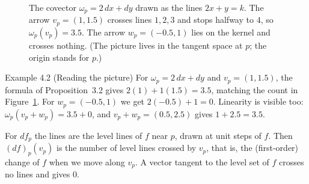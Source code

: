 \documentclass[11pt,letterpaper]{article}
\newcommand{\manualsubsection}[1]{%
  \Needspace{5\baselineskip}%
  \par\vspace{0.2cm}\noindent{\bfseries\color{orangeacc} #1}\par\nobreak
  \vspace{0.12cm}
}
\begin{document}
\begin{figure}[htbp]
\centering
{}
\caption{The covector $\omega_p=2\,dx+dy$ drawn as the lines $2x+y=k$. The arrow $v_p=(1,1.5)$ crosses lines $1,2,3$ and stops halfway to $4$, so $\omega_p(v_p)=3.5$. The arrow $w_p=(-0.5,1)$ lies on the kernel and crosses nothing. (The picture lives in the tangent space at $p$; the origin stands for $p$.)}
\label{fig:stack}
\end{figure}
\FloatBarrier

\begin{examplebox}{Example 4.2 (Reading the picture)}
For $\omega_p=2\,dx+dy$ and $v_p=(1,1.5)$, the formula of Proposition~3.2 gives $2(1)+1(1.5)=3.5$, matching the count in Figure~\ref{fig:stack}. For $w_p=(-0.5,1)$ we get $2(-0.5)+1=0$. Linearity is visible too: $\omega_p(v_p+w_p)=3.5+0$, and $v_p+w_p=(0.5,2.5)$ gives $1+2.5=3.5$.
\end{examplebox}

\manualsubsection{The differential $df$ and level lines}
For $df_p$ the lines are the level lines of $f$ near $p$, drawn at unit steps of $f$. Then $(df)_p(v_p)$ is the number of level lines crossed by $v_p$, that is, the (first-order) change of $f$ when we move along $v_p$. A vector tangent to the level set of $f$ crosses no lines and gives $0$.
\end{document}
